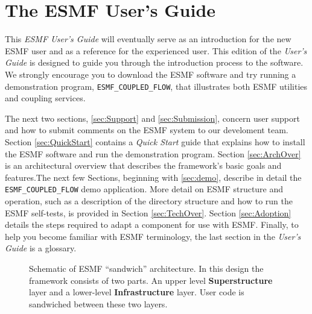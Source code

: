 \section{The ESMF User's Guide}

This {\it ESMF User's Guide} will eventually serve as an introduction for the 
new ESMF user and as a reference for the experienced user.
This edition of the {\it User's Guide} 
is designed to guide you through the introduction process
to the software.  We strongly encourage you
to download the ESMF software and try running a demonstration program, 
{\tt ESMF\_COUPLED\_FLOW}, that illustrates both ESMF utilities and coupling
services.

The next two sections, \ref{sec:Support} and \ref{sec:Submission}, concern 
user support and how to submit comments on the ESMF system to our develoment 
team.  Section \ref{sec:QuickStart} contains a {\it Quick Start} guide that 
explains how to install the ESMF software and 
run the demonstration program.  Section \ref{sec:ArchOver} is an 
architectural overview that describes the framework's basic goals and features.The next few Sections, beginning with \ref{sec:demo}, describe in detail
the {\tt ESMF\_COUPLED\_FLOW} demo application.    
More detail on ESMF structure and operation, such as a description of the 
directory structure and how to run the ESMF self-tests, is provided in Section 
\ref{sec:TechOver}.  Section \ref{sec:Adoption} details the steps 
required to adapt a component for use with ESMF.  Finally, to help you become 
familiar with ESMF terminology, the last section in the {\it User's Guide} is 
a glossary.  

\begin{center}
\begin{figure}
\caption{Schematic of ESMF ``sandwich'' architecture. In this design the framework consists of two parts. An upper level
{\bf Superstructure} layer and a lower-level {\bf Infrastructure} layer. User code is sandwiched between these two layers.}
\label{fig:TheESMFwich}
\end{figure}
\end{center}
















